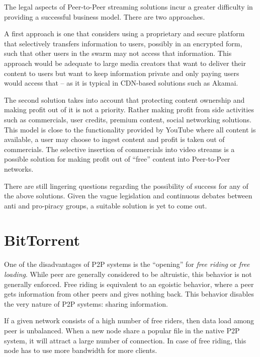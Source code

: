 The legal aspects of Peer-to-Peer streaming solutions incur a greater
difficulty in providing a successful business model. There are two approaches.

A first approach is one that considers using a proprietary and secure platform
that selectively transfers information to users, possibly in an encrypted
form, such that other users in the swarm may not access that information. This
approach would be adequate to large media creators that want to deliver their
content to users but want to keep information private and only paying users
would access that -- as it is typical in CDN-based solutions such as Akamai.

The second solution takes into account that protecting content ownership and
making profit out of it is not a priority. Rather making profit from side
activities such as commercials, user credits, premium content, social
networking solutions. This model is close to the functionality provided by
YouTube where all content is available, a user may choose to ingest content
and profit is taken out of commercials. The selective insertion of commercials
into video streams is a possible solution for making profit out of ``free''
content into Peer-to-Peer networks.

There are still lingering questions regarding the possibility of success for
any of the above solutions. Given the vague legislation and continuous debates
between anti and pro-piracy groups, a suitable solution is yet to come out.

\section{BitTorrent}
\label{sec:p2p-systems:bittorrent}

One of the disadvantages of P2P systems is the ``opening'' for \textit{free
riding} \cite{free-riding} or \textit{free loading}. While peer are generally
considered to be altruistic, this behavior is not generally enforced. Free
riding is equivalent to an egoistic behavior, where a peer gets information
from other peers and gives nothing back. This behavior disables the very
nature of P2P systems: sharing information.

If a given network consists of a high number of free riders, then data load
among peer is unbalanced. When a new node share a popular file in the native
P2P system, it will attract a large number of connection. In case of free
riding, this node has to use more bandwidth for more clients.

